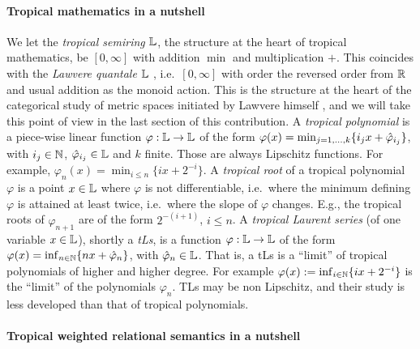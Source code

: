 \documentclass[submission,%
]{eptcs}
\begin{document}
\paragraph{Tropical mathematics in a nutshell}

We let the \emph{tropical semiring}  $\mathbb{L}$, the structure at the heart of tropical mathematics, be $[0,\infty]$ with addition $\min$ and multiplication $+$.
This coincides with the \emph{Lawvere quantale} $\mathbb{L}$ \cite{Hofmann2014, Stubbe2014}, i.e.\ $[0,\infty]$ with order the reversed order from $\mathbb{R}$ and usual addition as the monoid action. 
This is the structure at the heart of the categorical study of metric spaces initiated by Lawvere himself \cite{Lawvere1973}, and we will take this point of view in the last section of this contribution.
A \emph{tropical polynomial} is a piece-wise linear function $\varphi:\mathbb{L}\to \mathbb{L}$ of the form $\varphi(x)=\min_{j=1,\dots,k}\{i_{j}x+\hat{\varphi}_{i_{j}}\}$, with $i_{j}\in\mathbb{N}$, $\hat{\varphi}_{i_{j}}\in\mathbb{L}$ and $k$ finite.
Those are always Lipschitz functions.
For example, $\varphi_{n}(x)=\min_{i\leq n}\{ix+2^{-i}\}$.
A \emph{tropical root} of a tropical polynomial $\varphi$ is a point $x\in \mathbb{L}$ where $\varphi$ is not differentiable, i.e.\ where the minimum defining $\varphi$ is attained at least twice, i.e.~where the slope of $\varphi$ changes. E.g., the tropical roots of $\varphi_{n+1}$ are of the form $2^{-(i+1)}$, $i \leq n$.
A \emph{tropical Laurent series} (of one variable $x\in\mathbb{L}$), shortly a \emph{tLs}, is a function $\varphi:\mathbb{L}\to \mathbb{L}$ of the form $\varphi(x)=\inf_{n\in\mathbb{N}}\{nx+\hat{\varphi}_{n}\}$, with $\hat{\varphi}_{n}\in\mathbb{L}$.
That is, a tLs is a ``limit'' of tropical polynomials of higher and higher degree.
For example $\varphi(x):=\inf_{i\in\mathbb{N}}\{ix+2^{-i}\}$ %
is the ``limit'' of the polynomials $\varphi_{n}$. %
TLs may be non Lipschitz, and their study is less developed than that of tropical polynomials.

\paragraph{Tropical weighted relational semantics in a nutshell}
\end{document}
